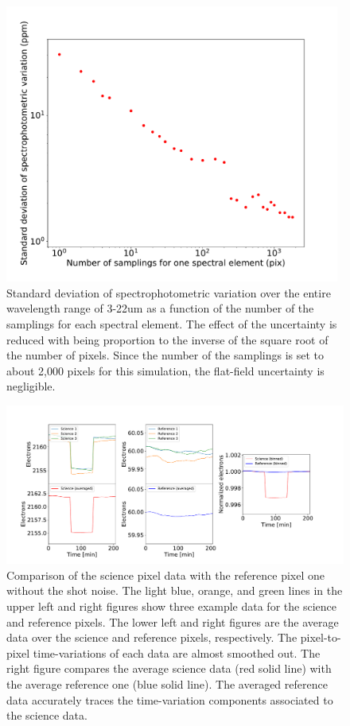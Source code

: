 \documentclass{aastex62}
\begin{document}
\begin{figure}[H]
\begin{center}
\includegraphics[width=11cm]{flat_field.pdf}
\caption{Standard deviation of spectrophotometric variation over the entire wavelength range of 3-22um as a function of the number of the samplings for each spectral element. The effect of the uncertainty is reduced with being proportion to the inverse of the square root of the number of pixels. Since the number of the samplings is set to about 2,000 pixels for this simulation, the flat-field uncertainty is negligible. \label{fig:flat_field}}
\end{center}
\end{figure}

\begin{figure}[H]
\begin{center}
\includegraphics[width=14cm]{smoothed_out.pdf}
\caption{Comparison of the science pixel data with the reference pixel one without the shot noise. The light blue, orange, and green lines in the upper left and right figures show three example data for the science and reference pixels. The lower left and right figures are the average data over the science and reference pixels, respectively. The pixel-to-pixel time-variations of each data are almost smoothed out. The right figure compares the average science data (red solid line) with the average reference one (blue solid line). The averaged reference data accurately traces the time-variation components associated to the science data.\label{fig:smoothed_out}}
\end{center}
\end{figure}
\end{document}
